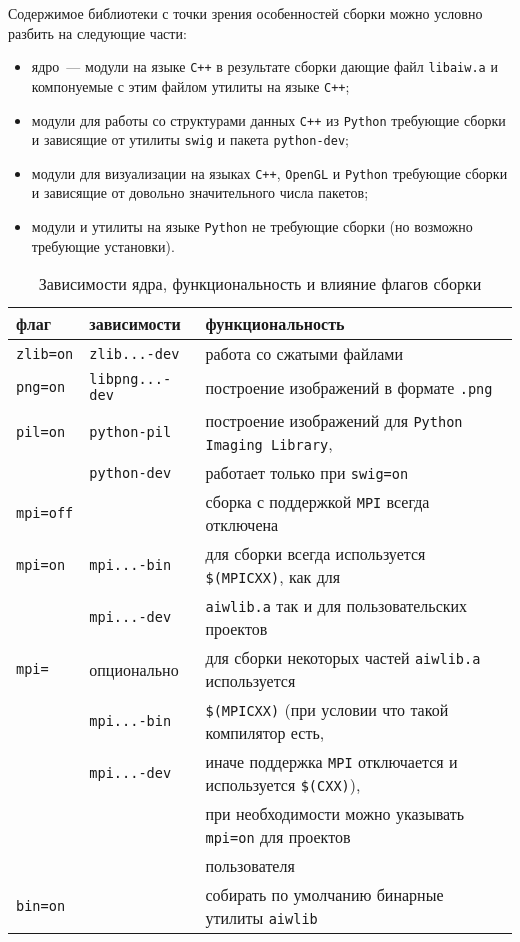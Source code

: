 Содержимое библиотеки с точки зрения особенностей сборки можно условно разбить на следующие части:
\begin{itemize}
  \item ядро~--- модули на языке \verb'C++' в результате сборки дающие файл
    \verb'libaiw.a' и компонуемые с этим файлом утилиты на языке \verb'C++';
  \item модули для работы со структурами данных \verb'C++' из
    \verb'Python' требующие сборки и зависящие от утилиты \verb'swig' и пакета \verb'python-dev';
  \item модули для визуализации на языках \verb'C++', \verb'OpenGL' и
    \verb'Python' требующие сборки и зависящие от довольно
    значительного числа пакетов;
  \item модули и утилиты на языке \verb'Python' не требующие сборки
    (но возможно требующие установки).
\end{itemize}

\begin{table}
\begin{center}
\begin{tabular}{lll}
  \hline
  флаг & зависимости & функциональность \\
  \hline
  \verb'zlib=on' & \verb'zlib...-dev' & работа со сжатыми
  файлами \\[3mm]
  \verb'png=on' & \verb'libpng...-dev' & построение изображений в
  формате \verb'.png' \\[3mm]
  \verb'pil=on' & \verb'python-pil' & построение изображений для {\tt Python Imaging Library}, \\  
                & \verb'python-dev' & работает только при \verb'swig=on' \\[3mm]  
  \verb'mpi=off' &  & сборка с поддержкой \verb'MPI' всегда отключена \\[3mm]  
  \verb'mpi=on' & \verb'mpi...-bin' & для сборки всегда используется \verb'$(MPICXX)', как для  \\  
                & \verb'mpi...-dev' & {\tt aiwlib.a} так и для пользовательских проектов \\[3mm]  
  \verb'mpi='   & опционально       & для сборки некоторых частей {\tt aiwlib.a} используется  \\  
                & \verb'mpi...-bin' & \verb'$(MPICXX)' (при условии что такой компилятор есть, \\
                & \verb'mpi...-dev' & иначе поддержка \verb'MPI' отключается и используется \verb'$(CXX)'), \\
                &                   & при необходимости можно указывать \verb'mpi=on' для проектов \\
                &                   & пользователя  \\[3mm]
  \verb'bin=on' &                   & собирать по умолчанию бинарные утилиты \verb'aiwlib' \\
  \hline
\end{tabular}
\end{center}
\caption{Зависимости ядра, функциональность и влияние флагов сборки}\label{make:core:flags:table}
\end{table}

